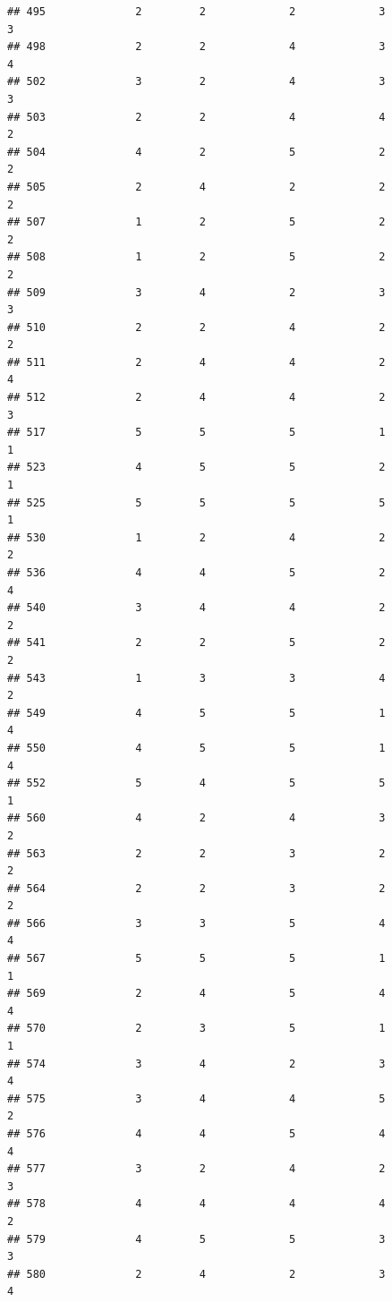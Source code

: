 \documentclass[
]{article}
\begin{document}
\begin{verbatim}
## 495              2         2             2             3           3
## 498              2         2             4             3           4
## 502              3         2             4             3           3
## 503              2         2             4             4           2
## 504              4         2             5             2           2
## 505              2         4             2             2           2
## 507              1         2             5             2           2
## 508              1         2             5             2           2
## 509              3         4             2             3           3
## 510              2         2             4             2           2
## 511              2         4             4             2           4
## 512              2         4             4             2           3
## 517              5         5             5             1           1
## 523              4         5             5             2           1
## 525              5         5             5             5           1
## 530              1         2             4             2           2
## 536              4         4             5             2           4
## 540              3         4             4             2           2
## 541              2         2             5             2           2
## 543              1         3             3             4           2
## 549              4         5             5             1           4
## 550              4         5             5             1           4
## 552              5         4             5             5           1
## 560              4         2             4             3           2
## 563              2         2             3             2           2
## 564              2         2             3             2           2
## 566              3         3             5             4           4
## 567              5         5             5             1           1
## 569              2         4             5             4           4
## 570              2         3             5             1           1
## 574              3         4             2             3           4
## 575              3         4             4             5           2
## 576              4         4             5             4           4
## 577              3         2             4             2           3
## 578              4         4             4             4           2
## 579              4         5             5             3           3
## 580              2         4             2             3           4

\end{verbatim}
\end{document}
